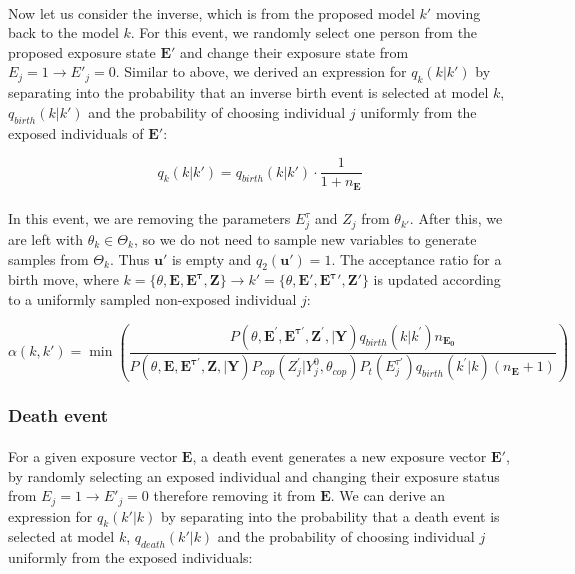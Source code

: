 \paragraph{}Now let us consider the inverse, which is from the proposed model $k'$ moving back to the model $k$. For this event, we randomly select one person from the proposed exposure state $\mathbf{E'}$ and change their exposure state from $E_j = 1 \rightarrow E'_j = 0$. Similar to above, we derived an expression for $q_k(k | k')$ by separating into the probability that an inverse birth event is selected at model $k$, $q_{birth}(k |k')$ and the probability of choosing individual $j$ uniformly from the exposed individuals of $\mathbf{E}'$:

\begin{equation}
q_k(k | k') = q_{birth}(k |k')\cdot \frac{1}{1 + n_{\mathbf{E}}}
\end{equation}


\paragraph{}In this event, we are removing the parameters $E_j^\tau$ and $Z_j$ from $\theta_{k'}$. After this, we are left with $\theta_k \in \Theta_k$, so we do not need to sample new variables to generate samples from $\Theta_k$. Thus $\mathbf{u}'$ is empty and  $q_2(\mathbf{u}') = 1$. The acceptance ratio for a birth move, where $k = \{\theta, \mathbf{E}, \mathbf{E^\tau}, \mathbf{Z}\} \rightarrow k' = \{\theta, \mathbf{E}', \mathbf{E^\tau}', \mathbf{Z}'\}$ is updated according to a uniformly sampled non-exposed individual $j$:

\begin{equation}
\label{acc:birth}
\alpha(k, k') = \min\left(\frac{P(\theta, \mathbf{E}^{\prime}, \mathbf{E^{\tau \prime}}, \mathbf{Z}^{\prime}, | \mathbf{Y})q_{birth}(k|k^{\prime})n_{\mathbf{E_0}}}{P(\theta, \mathbf{E}, \mathbf{E^{\tau \prime}}, \mathbf{Z}, | \mathbf{Y})P_{cop}(Z_{j}^{\prime} | Y_{j}^{0}, \theta_{cop})P_t(E^{\tau \prime}_j )q_{birth}(k^{\prime} |k)(n_{\mathbf{E}} + 1)} \right)
\end{equation}


\subsubsection{Death event}


\paragraph{}For a given exposure vector $\mathbf{E}$, a death event generates a new exposure vector $\mathbf{E'}$, by randomly selecting an exposed individual and changing their exposure status from $E_j = 1 \rightarrow E'_j = 0$ therefore removing it from $\mathbf{E}$. We can derive an expression for $q_k(k' | k)$ by separating into the probability that a death event is selected at model $k$, $q_{death}(k' |k)$ and the probability of choosing individual $j$ uniformly from the exposed individuals:

